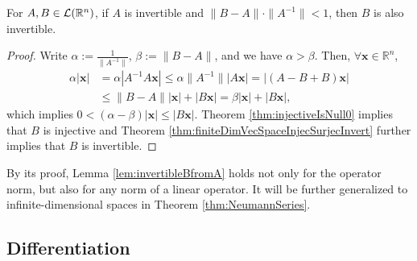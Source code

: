 
\begin{lem}
  \label{lem:invertibleBfromA}
  For $A,B\in {\cal L}(\mathbb{R}^n)$,
  if $A$ is invertible and $\|B-A\|\cdot\|A^{-1}\|<1$,
  then $B$ is also invertible.
\end{lem}
\begin{proof}
  Write $\alpha := \frac{1}{\|A^{-1}\|}$, $\beta := \|B-A\|$,
  and we have $\alpha>\beta$. 
  Then, $\forall \mathbf{x}\in\mathbb{R}^n$,
  \begin{displaymath}
    \begin{array}{rl}
      \alpha |\mathbf{x}|
      &= \alpha|A^{-1}A \mathbf{x}|
        \le \alpha\|A^{-1}\| |A\mathbf{x}|
        = |(A-B+B)\mathbf{x}|
      \\
      & \le \|B-A\||\mathbf{x}| + |B\mathbf{x}|
        = \beta |\mathbf{x}| + |B\mathbf{x}|, 
    \end{array}
  \end{displaymath}
  which implies $0< (\alpha-\beta)|\mathbf{x}|\le |B\mathbf{x}|$.
  Theorem \ref{thm:injectiveIsNull0} implies that
  $B$ is injective and
  Theorem \ref{thm:finiteDimVecSpaceInjecSurjecInvert}
  further implies that $B$ is invertible.
\end{proof}

\begin{rem}
  By its proof, Lemma \ref{lem:invertibleBfromA} holds not only
  for the operator norm,
  but also for any norm of a linear operator. 
  It will be further generalized to infinite-dimensional spaces
  in Theorem \ref{thm:NeumannSeries}.
\end{rem}


\subsection{Differentiation}

